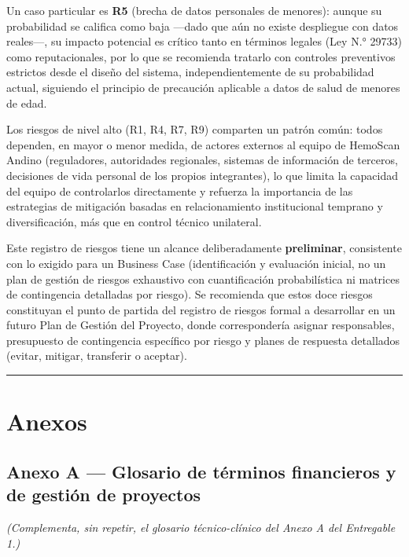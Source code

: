 \documentclass[11pt,a4paper]{article}
\begin{document}
Un caso particular es \textbf{R5} (brecha de datos personales de menores): aunque su probabilidad se califica como baja ---dado que aún no existe despliegue con datos reales---, su impacto potencial es crítico tanto en términos legales (Ley N.° 29733) como reputacionales, por lo que se recomienda tratarlo con controles preventivos estrictos desde el diseño del sistema, independientemente de su probabilidad actual, siguiendo el principio de precaución aplicable a datos de salud de menores de edad.

Los riesgos de nivel alto (R1, R4, R7, R9) comparten un patrón común: todos dependen, en mayor o menor medida, de actores externos al equipo de HemoScan Andino (reguladores, autoridades regionales, sistemas de información de terceros, decisiones de vida personal de los propios integrantes), lo que limita la capacidad del equipo de controlarlos directamente y refuerza la importancia de las estrategias de mitigación basadas en relacionamiento institucional temprano y diversificación, más que en control técnico unilateral.

Este registro de riesgos tiene un alcance deliberadamente \textbf{preliminar}, consistente con lo exigido para un Business Case (identificación y evaluación inicial, no un plan de gestión de riesgos exhaustivo con cuantificación probabilística ni matrices de contingencia detalladas por riesgo). Se recomienda que estos doce riesgos constituyan el punto de partida del registro de riesgos formal a desarrollar en un futuro Plan de Gestión del Proyecto, donde correspondería asignar responsables, presupuesto de contingencia específico por riesgo y planes de respuesta detallados (evitar, mitigar, transferir o aceptar).

\begin{center}\rule{0.5\linewidth}{0.5pt}\end{center}

\section{Anexos}\label{anexos}

\subsection{Anexo A --- Glosario de términos financieros y de gestión de proyectos}\label{anexo-a-glosario-de-tuxe9rminos-financieros-y-de-gestiuxf3n-de-proyectos}

\emph{(Complementa, sin repetir, el glosario técnico-clínico del Anexo A del Entregable 1.)}
\end{document}
